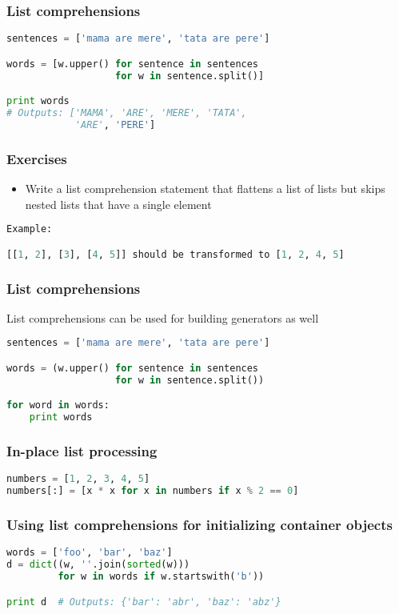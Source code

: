 \documentclass{beamer}
\begin{document}
\begin{frame}[fragile]
\frametitle{List comprehensions}
\begin{lstlisting}[language=python]
sentences = ['mama are mere', 'tata are pere']

words = [w.upper() for sentence in sentences
                   for w in sentence.split()]

print words
# Outputs: ['MAMA', 'ARE', 'MERE', 'TATA',
            'ARE', 'PERE']
\end{lstlisting}
\end{frame}


\begin{frame}[fragile]
\frametitle{Exercises}
\begin{itemize}
  \item Write a list comprehension statement that flattens a list of lists but
    skips nested lists that have a single element
\end{itemize}

\begin{lstlisting}[language=python]
Example:

[[1, 2], [3], [4, 5]] should be transformed to [1, 2, 4, 5]
\end{lstlisting}
\end{frame}


\begin{frame}[fragile]
\frametitle{List comprehensions}
List comprehensions can be used for building generators as well
\begin{lstlisting}[language=python]
sentences = ['mama are mere', 'tata are pere']

words = (w.upper() for sentence in sentences
                   for w in sentence.split())

for word in words:
    print words
\end{lstlisting}
\end{frame}


\begin{frame}[fragile]
\frametitle{In-place list processing}
\begin{lstlisting}[language=python]
numbers = [1, 2, 3, 4, 5]
numbers[:] = [x * x for x in numbers if x % 2 == 0]
\end{lstlisting}
\end{frame}

\begin{frame}[fragile]
\frametitle{Using list comprehensions for initializing container objects}
\begin{lstlisting}[language=python]
words = ['foo', 'bar', 'baz']
d = dict((w, ''.join(sorted(w)))
         for w in words if w.startswith('b'))

print d  # Outputs: {'bar': 'abr', 'baz': 'abz'}
\end{lstlisting}
\end{frame}
\end{document}
